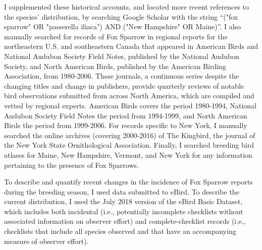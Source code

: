 \documentclass[fleqn,10pt,lineno]{wlpeerj} %
\begin{document}
I supplemented these historical accounts, and located more recent references to the species’ distribution, by searching Google Scholar with the string “("fox sparrow" OR "passerella iliaca") AND ("New Hampshire" OR Maine)”. I also manually searched for records of Fox Sparrow in regional reports for the northeastern U.S. and southeastern Canada that appeared in American Birds and National Audubon Society Field Notes, published by the National Audubon Society, and North American Birds, published by the American Birding Association, from 1980-2006. These journals, a continuous series despite the changing titles and change in publishers, provide quarterly reviews of notable bird observations submitted from across North America, which are compiled and vetted by regional experts. American Birds covers the period 1980-1994, National Audubon Society Field Notes the period from 1994-1999, and North American Birds the period from 1999-2006. For records specific to New York, I manually searched the online archives (covering 2000-2016) of The Kingbird, the journal of the New York State Ornithological Association. Finally, I searched breeding bird atlases for Maine, New Hampshire, Vermont, and New York for any information pertaining to the presence of Fox Sparrows.

To describe and quantify recent changes in the incidence of Fox Sparrow reports during the breeding season, I used data submitted to eBird. To describe the current distribution, I used the July 2018 version of the eBird Basic Dataset, which includes both incidental (i.e., potentially incomplete checklists without associated information on observer effort) and complete-checklist records (i.e., checklists that include all species observed and that have an accompanying measure of observer effort). 
\end{document}
